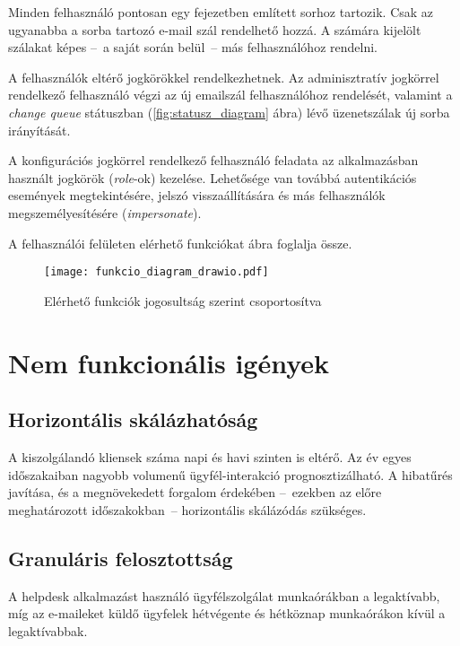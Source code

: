 	
Minden felhasználó pontosan egy  fejezetben említett sorhoz tartozik. Csak az ugyanabba a sorba tartozó e-mail szál rendelhető hozzá.
A számára kijelölt szálakat képes --~a saját során belül~--  más felhasználóhoz rendelni. 

A felhasználók eltérő jogkörökkel rendelkezhetnek. Az adminisztratív jogkörrel rendelkező felhasználó végzi az új emailszál felhasználóhoz rendelését, valamint a \foreignlanguage{british}{\emph{change queue}} státuszban (\ref{fig:statusz_diagram} ábra) lévő üzenetszálak új sorba irányítását.

A konfigurációs jogkörrel rendelkező felhasználó feladata az alkalmazásban használt jogkörök (\foreignlanguage{british}{\emph{role}}-ok) kezelése. Lehetősége van továbbá autentikációs események megtekintésére, jelszó visszaállítására és más felhasználók megszemélyesítésére (\foreignlanguage{british}{\emph{impersonate}}).

A felhasználói felületen elérhető funkciókat  ábra foglalja össze.

\begin{figure}[hbt] 
	\centering
	\texttt{[image: funkcio\_diagram\_drawio.pdf]}
	\caption[Elérhető funkciók]{Elérhető funkciók jogosultság szerint csoportosítva}
	\label{fig:funkcio_diagram}
\end{figure}



\pagebreak
\section{Nem funkcionális igények}	

\subsection[Skálázhatóság]{Horizontális skálázhatóság}
A kiszolgálandó kliensek száma napi és havi szinten is eltérő. Az év egyes időszakaiban nagyobb volumenű ügyfél-interakció prognosztizálható. A hibatűrés javítása, és a megnövekedett forgalom érdekében --~ezekben az előre meghatározott időszakokban~--  horizontális skálázódás szükséges.


\subsection{Granuláris felosztottság}\label{sec:granularitas}
A \foreignlanguage{british}{helpdesk} alkalmazást használó ügyfélszolgálat munkaórákban a legaktívabb, míg az e-maileket küldő ügyfelek hétvégente és hétköznap munkaórákon kívül a legaktívabbak.


